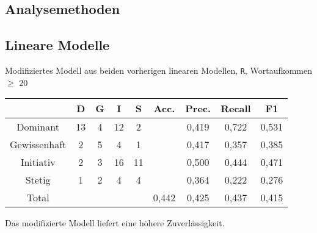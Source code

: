 \begin{frame}
\section{Analysemethoden}
\subsection{Lineare Modelle}
Modifiziertes Modell aus beiden vorherigen linearen Modellen, \texttt{R}, Wortaufkommen $\geq$ 20\\
\vspace{12pt}
\begin{tabular}{|c|c|c|c|c|c|c|c|c|}
\hline
				& D 	& G	& I & S	& Acc.	& Prec. & Recall	& F1\\
\hline
Dominant 		& 13	& 4 & 12& 2 &      	& 0,419 & 0,722 	& 0,531\\
Gewissenhaft 	& 2 	& 5 & 4 & 1 & 		& 0,417 & 0,357 	& 0,385\\
Initiativ 		& 2 	& 3	& 16& 11& 		& 0,500	& 0,444 	& 0,471\\
Stetig 			& 1 	& 2 & 4	& 4 & 		& 0,364	& 0,222 	& 0,276\\
\hline
Total 			& 		& 	& 	& 	& 0,442	& 0,425 & 0,437	  	& 0,415\\
\hline
\end{tabular}
 \vspace{12pt}
 
Das modifizierte Modell liefert eine höhere Zuverlässigkeit.
\end{frame}
